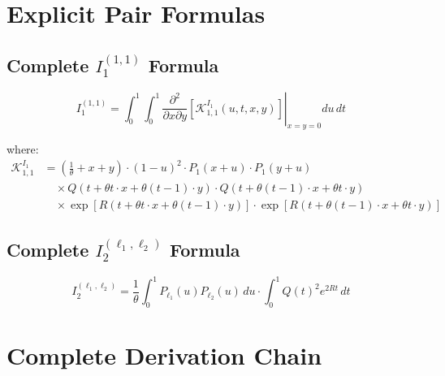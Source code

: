 \documentclass[11pt]{article}
\begin{document}
\section{Explicit Pair Formulas}
\label{app:pairs}

\subsection{Complete $I_1^{(1,1)}$ Formula}

\begin{equation}
I_1^{(1,1)} = \int_0^1 \int_0^1 \left.\frac{\partial^2}{\partial x \partial y}\left[\mathcal{K}^{I_1}_{1,1}(u,t,x,y)\right]\right|_{x=y=0} du\, dt
\end{equation}

where:
\begin{align}
\mathcal{K}^{I_1}_{1,1} &= \left(\frac{1}{\theta} + x + y\right) \cdot (1-u)^2 \cdot P_1(x+u) \cdot P_1(y+u) \\
&\quad \times Q(t + \theta t \cdot x + \theta(t-1) \cdot y) \cdot Q(t + \theta(t-1) \cdot x + \theta t \cdot y) \\
&\quad \times \exp\left[R(t + \theta t \cdot x + \theta(t-1) \cdot y)\right] \cdot \exp\left[R(t + \theta(t-1) \cdot x + \theta t \cdot y)\right]
\end{align}

\subsection{Complete $I_2^{(\ell_1,\ell_2)}$ Formula}

\begin{equation}
I_2^{(\ell_1,\ell_2)} = \frac{1}{\theta} \int_0^1 P_{\ell_1}(u) P_{\ell_2}(u) \, du \cdot \int_0^1 Q(t)^2 e^{2Rt} \, dt
\end{equation}

\section{Complete Derivation Chain}
\label{app:chain}
\end{document}
